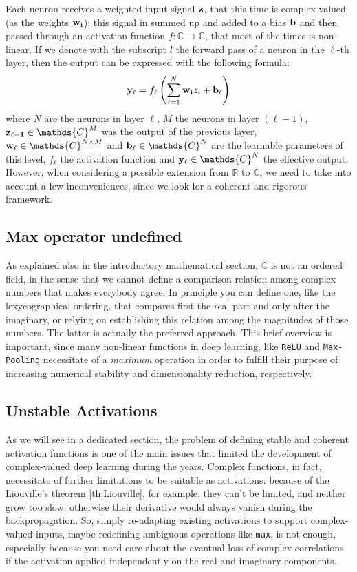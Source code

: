 \documentclass[../main.tex]{subfiles}
\begin{document}
Each neuron receives a weighted input signal $\vb{z}$, that this time is complex valued (as the weights $\vb{w_i}$); this signal in summed up and added to a bias $\vb{b}$ and then passed through an activation function $f:\mathds{C}\to\mathds{C}$, that most of the times is non-linear. If we denote with the subscript $l$ the forward pass of a neuron in the $\ell$-th layer, then the output can be expressed with the following formula:
\[ \vb{y}_\ell = f_\ell\left(\sum_{i=1}^{N}\vb{w_i}z_i + \vb{b}_\ell\right) \]
where $N$ are the neurons in layer $\ell$, $M$ the neurons in layer $(\ell-1)$, $\vb{z_{\ell-1}}\in\mathds{C}^M$ was the output of the previous layer, $\vb{w}_\ell\in\mathds{C}^{N\times M}$ and $\vb{b}_\ell\in\mathds{C}^N$ are the learnable parameters of this level, $f_\ell$ the activation function and $\vb{y}_\ell\in\mathds{C}^N$ the effective output.\\
However, when considering a possible extension from $\mathds{R}$ to $\mathds{C}$, we need to take into account a few inconveniences, since we look for a coherent and rigorous framework. 

\subsection*{Max operator undefined}
As explained also in the introductory mathematical section, $\mathds{C}$ is not an ordered field, in the sense that we cannot define a comparison relation among complex numbers that makes everybody agree. In principle you can define one, like the lexycographical ordering, that compares first the real part and only after the imaginary, or relying on establishing this relation among the magnitudes of those numbers. The latter is actually the preferred approach. This brief overview is important, since many non-linear functions in deep learning, like \texttt{ReLU} and \texttt{Max-Pooling} necessitate of a \textit{maximum} operation in order to fulfill their purpose of increasing numerical stability and dimensionality reduction, respectively.

\subsection*{Unstable Activations}
As we will see in a dedicated section, the problem of defining stable and coherent activation functions is one of the main issues that limited the development of complex-valued deep learning during the years. Complex functions, in fact, necessitate of further limitations to be suitable as activations: because of the Liouville's theorem \ref{th:Liouville}, for example, they can't be limited, and neither grow too slow, otherwise their derivative would always vanish during the backpropagation. So, simply re-adapting existing activations to support complex-valued inputs, maybe redefining ambiguous operations like \texttt{max}, is not enough, especially because you need care about the eventual loss of complex correlations if the activation applied independently on the real and imaginary components.
\end{document}
